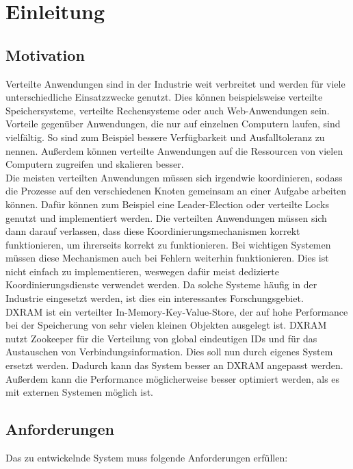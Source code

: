  \chapter{Einleitung}

\section{Motivation}

Verteilte Anwendungen sind in der Industrie weit verbreitet und werden für viele unterschiedliche Einsatzzwecke genutzt. Dies können beispielsweise verteilte Speichersysteme, verteilte Rechensysteme oder auch Web-Anwendungen sein. Vorteile gegenüber Anwendungen, die nur auf einzelnen Computern laufen, sind vielfältig. So sind zum Beispiel bessere Verfügbarkeit und Ausfalltoleranz zu nennen. Außerdem können verteilte Anwendungen auf die Ressourcen von vielen Computern zugreifen und skalieren besser. \\
Die meisten verteilten Anwendungen müssen sich irgendwie koordinieren, sodass die Prozesse auf den verschiedenen Knoten gemeinsam an einer Aufgabe arbeiten können. Dafür können zum Beispiel eine Leader-Election oder verteilte Locks genutzt und implementiert werden. Die verteilten Anwendungen müssen sich dann darauf verlassen, dass diese Koordinierungsmechanismen korrekt funktionieren, um ihrerseits korrekt zu funktionieren. Bei wichtigen Systemen müssen diese Mechanismen auch bei Fehlern weiterhin funktionieren. Dies ist nicht einfach zu implementieren, weswegen dafür meist dedizierte Koordinierungsdienste verwendet werden. Da solche Systeme häufig in der Industrie eingesetzt werden, ist dies ein interessantes Forschungsgebiet. \\
DXRAM \cite{dxram} ist ein verteilter In-Memory-Key-Value-Store, der auf hohe Performance bei der Speicherung von sehr vielen kleinen Objekten ausgelegt ist. DXRAM nutzt Zookeeper \cite{zookeeper} für die Verteilung von global eindeutigen IDs und für das Austauschen von Verbindungsinformation. Dies soll nun durch eigenes System ersetzt werden. Dadurch kann das System besser an DXRAM angepasst werden. Außerdem kann die Performance möglicherweise besser optimiert werden, als es mit externen Systemen möglich ist.

\section{Anforderungen}

Das zu entwickelnde System muss folgende Anforderungen erfüllen:

